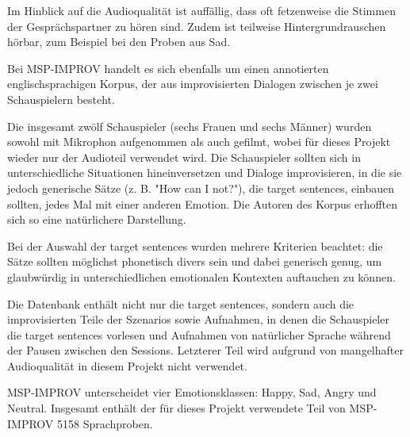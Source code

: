 \documentclass{article} %
\begin{document}
Im Hinblick auf die Audioqualität ist auffällig, dass oft fetzenweise die Stimmen der Gesprächspartner zu hören sind. Zudem ist teilweise Hintergrundrauschen hörbar, zum Beispiel bei den Proben aus Sad. 

Bei MSP-IMPROV handelt es sich ebenfalls um einen annotierten englischsprachigen Korpus, der aus improvisierten Dialogen zwischen je zwei Schauspielern besteht. 

Die insgesamt zwölf Schauspieler (sechs Frauen und sechs Männer) wurden sowohl mit Mikrophon aufgenommen als auch gefilmt, wobei für dieses Projekt wieder nur der Audioteil verwendet wird. Die Schauspieler sollten sich in unterschiedliche Situationen hineinversetzen und Dialoge improvisieren, in die sie jedoch generische Sätze (z. B. "How can I not?"), die target sentences, einbauen sollten, jedes Mal mit einer anderen Emotion. Die Autoren des Korpus erhofften sich so eine natürlichere Darstellung. 

Bei der Auswahl der target sentences wurden mehrere Kriterien beachtet: die Sätze sollten möglichst phonetisch divers sein und dabei generisch genug, um glaubwürdig in unterschiedlichen emotionalen Kontexten auftauchen zu können. 

Die Datenbank enthält nicht nur die target sentences, sondern auch die improvisierten Teile der Szenarios sowie Aufnahmen, in denen die Schauspieler die target sentences vorlesen und Aufnahmen von natürlicher Sprache während der Pausen zwischen den Sessions. Letzterer Teil wird aufgrund von mangelhafter Audioqualität in diesem Projekt nicht verwendet. 

MSP-IMPROV unterscheidet vier Emotionsklassen: Happy, Sad, Angry und Neutral. Insgesamt enthält der für dieses Projekt verwendete Teil von MSP-IMPROV 5158 Sprachproben. 
\end{document}
